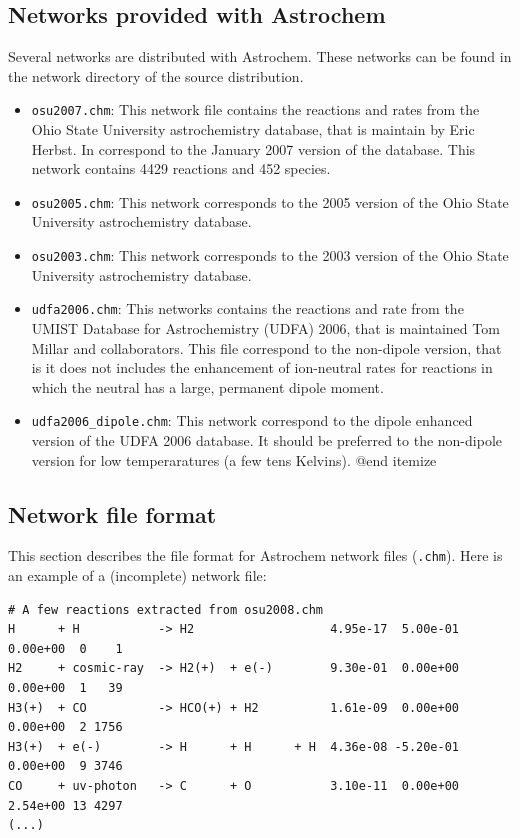 \documentclass[a4paper,12pt]{article}
\begin{document}
{\subsection{Networks provided with Astrochem}
\label{sec:netw-prov-with}

Several networks are distributed with Astrochem.  These networks can
be found in the network directory of the source distribution.

\begin{itemize}

\item \verb=osu2007.chm=: This network file contains the reactions and
  rates from the Ohio State University astrochemistry database, that
  is maintain by Eric Herbst. In correspond to the January 2007
  version of the database. This network contains 4429 reactions and
  452 species.

\item \verb=osu2005.chm=: This network corresponds to the 2005 version
  of the Ohio State University astrochemistry database.

\item \verb=osu2003.chm=: This network corresponds to the 2003 version
  of the Ohio State University astrochemistry database.

\item \verb=udfa2006.chm=: This networks contains the reactions and
  rate from the UMIST Database for Astrochemistry (UDFA) 2006, that is
  maintained Tom Millar and collaborators. This file correspond to the
  non-dipole version, that is it does not includes the enhancement of
  ion-neutral rates for reactions in which the neutral has a large,
  permanent dipole moment.

\item \verb=udfa2006_dipole.chm=: This network correspond to the
  dipole enhanced version of the UDFA 2006 database. It should be
  preferred to the non-dipole version for low temperaratures (a few
  tens Kelvins).  @end itemize

\end{itemize}

\subsection{Network file format}

This section describes the file format for Astrochem network files
(\verb=.chm=). Here is an example of a (incomplete) network file:

\begin{verbatim}
# A few reactions extracted from osu2008.chm
H      + H           -> H2                   4.95e-17  5.00e-01  0.00e+00  0    1
H2     + cosmic-ray  -> H2(+)  + e(-)        9.30e-01  0.00e+00  0.00e+00  1   39
H3(+)  + CO          -> HCO(+) + H2          1.61e-09  0.00e+00  0.00e+00  2 1756
H3(+)  + e(-)        -> H      + H      + H  4.36e-08 -5.20e-01  0.00e+00  9 3746
CO     + uv-photon   -> C      + O           3.10e-11  0.00e+00  2.54e+00 13 4297
(...)
\end{verbatim}

}
\end{document}
